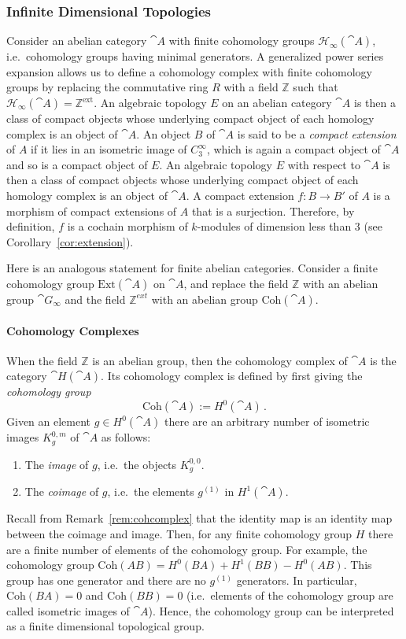 \documentclass[a4paper,reqno,oneside]{article}
\begin{document}
\subsubsection{Infinite Dimensional Topologies}
Consider an abelian category $\cat{A}$ with finite cohomology groups $\mathcal{H}_{\infty}(\cat{A})$, i.e.~cohomology groups having minimal generators. A generalized power series expansion allows us to define a cohomology complex with finite cohomology groups by replacing the commutative ring $R$ with a field $\mathbb{Z}$ such that $\mathcal{H}_{\infty}(\cat{A})=\mathbb{Z}^{\mathrm{ext}}$. An algebraic topology $E$ on an abelian category $\cat{A}$ is then a class of compact objects whose underlying compact object of each homology complex is an object of $\cat{A}$. An object $B$ of $\cat{A}$ is said to be a \emph{compact extension} of $A$ if it lies in an isometric image of $C^{\infty}_{3}$, which is again a compact object of $\cat{A}$ and so is a compact object of $E$. An algebraic topology $E$ with respect to $\cat{A}$ is then a class of compact objects whose underlying compact object of each homology complex is an object of $\cat{A}$. A compact extension $f:B\rightarrow B'$ of $A$ is a morphism of compact extensions of $A$ that is a surjection. Therefore, by definition, $f$ is a cochain morphism of $k$-modules of dimension less than $3$ (see Corollary~\ref{cor:extension}).

Here is an analogous statement for finite abelian categories. Consider a finite cohomology group $\mathrm{Ext}(\cat{A})$ on $\cat{A}$, and replace the field $\mathbb{Z}$ with an abelian group $\cat{G}_{\infty}$ and the field $\mathbb{Z}^{ext}$ with an abelian group $\mathrm{Coh}(\cat{A})$. 

\paragraph{Cohomology Complexes}
When the field $\mathbb{Z}$ is an abelian group, then the cohomology complex of $\cat{A}$ is the category $\cat{H}(\cat{A})$. Its cohomology complex is defined by first giving the \emph{cohomology group}
\[
\mathrm{Coh}(\cat{A}):=H^0(\cat{A})\,.
\]
Given an element $g\in H^0(\cat{A})$ there are an arbitrary number of isometric images $K_g^{0,m}$ of $\cat{A}$ as follows:
\begin{enumerate}
    \item The \emph{image} of $g$, i.e.~the objects $K_g^{0,0}$.
    \item The \emph{coimage} of $g$, i.e.~the elements $g^{(1)}$ in $H^1(\cat{A})$.
\end{enumerate}
Recall from Remark~\ref{rem:cohcomplex} that the identity map is an identity map between the coimage and image. Then, for any finite cohomology group $H$ there are a finite number of elements of the cohomology group. For example, the cohomology group $\mathrm{Coh}(AB)=H^0(BA)+H^1(BB)-H^0(AB)$. This group has one generator and there are no $g^{(1)}$ generators. In particular, $\mathrm{Coh}(BA)=0$ and $\mathrm{Coh}(BB)=0$ (i.e.~elements of the cohomology group are called isometric images of $\cat{A}$). Hence, the cohomology group can be interpreted as a finite dimensional topological group.
\end{document}
